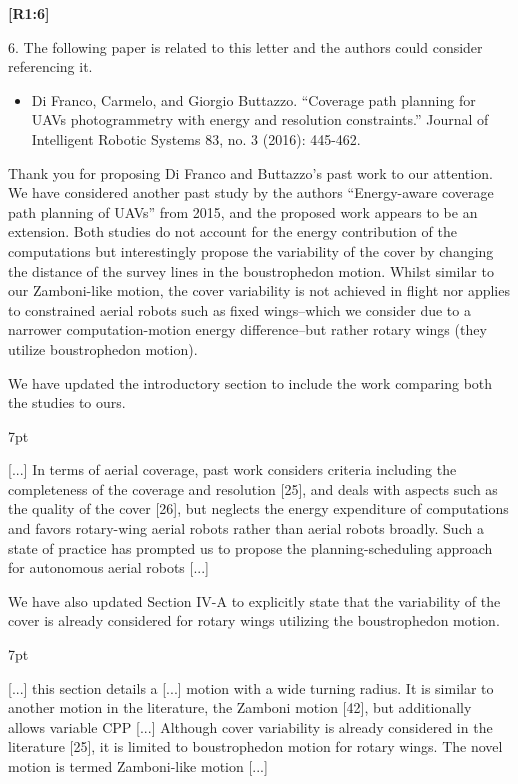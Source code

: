 \documentclass[10pt]{letter}
\newenvironment{formal}{%
  \def\FrameCommand{%
    \hspace{1pt}%
    {\color{red}\vrule width 2pt}%
    {\color{formalshade}\vrule width 4pt}%
    \colorbox{formalshade}%
  }%
  \MakeFramed{\advance\hsize-\width\FrameRestore}%
  \noindent\hspace{-4.55pt}%
  \begin{adjustwidth}{}{7pt}%
  \vspace{2pt}\vspace{2pt}%
}
{%
  \vspace{2pt}\end{adjustwidth}\endMakeFramed%
}
\begin{document}
{\hspace*{-4.5em}\textbf{[R1:6]}\vspace*{-1.9em}}

6. The following paper is related to this letter and the authors could consider referencing it.
\begin{itemize}
  \item Di Franco, Carmelo, and Giorgio Buttazzo. ``Coverage path planning for UAVs photogrammetry with energy and resolution constraints.'' Journal of Intelligent Robotic Systems 83, no. 3 (2016): 445-462.
\end{itemize}

{\color{blue} 

{\hspace*{-4.5em}{[R1:6]}\vspace*{-1.9em}}

Thank you for proposing Di Franco and Buttazzo's past work to our attention. We have considered another past study by the authors ``Energy-aware coverage path planning of UAVs'' from 2015, and the proposed work appears to be an extension. Both studies do not account for the energy contribution of the computations but interestingly propose the variability of the cover by changing the distance of the survey lines in the boustrophedon motion. Whilst similar to our Zamboni-like motion, the cover variability is not achieved in flight nor applies to constrained aerial robots such as fixed wings--which we consider due to a narrower computation-motion energy difference--but rather rotary wings (they utilize boustrophedon motion).

We have updated the introductory section to include the work comparing both the studies to ours.

\begin{formal}
  \color{black} [...] {\color{blue}In terms of aerial coverage, past work considers criteria including the completeness of the coverage and resolution [{\color{green}25}], and deals with aspects such as the quality of the cover [{\color{green}26}], but neglects the energy expenditure of computations and favors rotary-wing aerial robots rather than aerial robots broadly.} Such a state of practice has prompted us to propose the planning-scheduling approach for autonomous aerial robots [...]
  \vspace*{1ex}
\end{formal}

We have also updated Section IV-A to explicitly state that the variability of the cover is already considered for rotary wings utilizing the boustrophedon motion.

\begin{formal}
  \color{black} [...] this section details a [...] motion with a wide turning radius. It is similar to another motion in the literature, the Zamboni
  motion [{\color{green}42}], but additionally allows variable CPP [...] {\color{blue} Although cover variability is already considered in the literature [{\color{green}25}], it is limited to boustrophedon motion for rotary wings.} The novel motion is termed Zamboni-like motion [...]
  \vspace*{1ex}
\end{formal}
}
\end{document}
